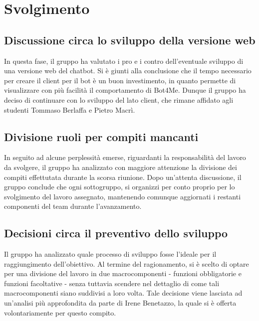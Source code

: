 \section{Svolgimento}
\subsection{Discussione circa lo sviluppo della versione web}
In questa fase, il gruppo ha valutato i pro e i contro dell'eventuale sviluppo di una versione web del chatbot. \newline
Si è giunti alla conclusione che il tempo necessario per creare il client per il bot è un buon investimento, in quanto permette di visualizzare con più facilità il comportamento di Bot4Me.
Dunque il gruppo ha deciso di continuare con lo sviluppo del lato client, che rimane affidato agli studenti Tommaso Berlaffa e Pietro Macrì.

\subsection{Divisione ruoli per compiti mancanti}
In seguito ad alcune perplessità emerse, riguardanti la responsabilità del lavoro da svolgere, il gruppo ha analizzato con maggiore attenzione la divisione dei compiti effettutata durante la scorsa riunione. \newline
Dopo un'attenta discussione, il gruppo conclude che ogni sottogruppo, si organizzi per conto proprio per lo svolgimento del lavoro assegnato, mantenendo comunque aggiornati i restanti componenti del team durante l'avanzamento.

\subsection{Decisioni circa il preventivo dello sviluppo}
Il gruppo ha analizzato quale processo di sviluppo fosse l'ideale per il raggiungimento dell'obiettivo. \newline
Al termine del ragionamento, si è scelto di optare per una divisione del lavoro in due macrocomponenti -
funzioni obbligatorie e funzioni facoltative - senza tuttavia scendere nel dettaglio di come tali macrocomponenti
siano suddivisi a loro volta. Tale decisione viene lasciata ad un'analisi più approfondita da parte di Irene
Benetazzo, la quale si è offerta volontariamente per questo compito.

\newpage